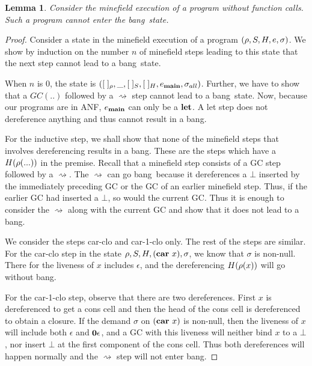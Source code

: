 \documentclass[preprint,9pt]{sigplanconf}
\newcommand{\warning}[1]{{\color{Myred}{#1}}}
\newcommand{\bang}{\mbox{\sc bang}}
\newtheorem{lemma}[theorem]{Lemma}
\begin{document}
\begin{lemma}
\label{lemma:call-less-cannot-go-bang-app}
Consider the minefield execution of  a program without function calls.
Such a program cannot enter the \bang\ state.
\end{lemma}
\begin{proof}
Consider a state in the minefield execution of a program $(\rho, S, H,
e, \sigma)$.   We show  by induction  on the  number $n$  of minefield
steps  leading to  this state  that  the next  step cannot  lead to  a
\bang\ state.

When $n$ is 0, the  state is $([\;]_\rho,\_, [\;]_{S} ,
[\;]_{H},  e_{\mathbf{main}},  \sigma_{all})$.  Further,  we
have   to  show   that   a  $GC(..)$   followed  by   a
$\rightsquigarrow$ step cannot lead  to a \bang\ state.
Now, because  our programs  are in  ANF, $e_{\mathbf{main}}$
can  only  be a  $\mbox{$\mathbf{ let}$}$.  A  {\sc  let} step  does  not
dereference anything and thus cannot result in a \bang.

For the inductive step, we  shall show that none of the
minefield steps that  involves dereferencing results in
a   \bang.   These  are   the   steps   which  have   a
$H(\rho(...))$ in the premise.  Recall that a minefield
step   consists   of   a   GC  step   followed   by   a
$\rightsquigarrow$.   The   $\rightsquigarrow$  can  go
\bang\ because it dereferences a $\bot$ inserted by the
immediately  preceding  GC  or  the GC  of  an  earlier
minefield step.  \warning{However the  demand $\sigma'$
  on basis of which an earlier GC would have inserted a
  $\bot$,  would  have   included  the  current  demand
  $\sigma$.}  Thus,  if the  earlier GC had  inserted a
$\bot$, so would the current  GC.  Thus it is enough to
consider the $\rightsquigarrow$  along with the current
GC and show that it does not lead to a \bang.

We consider the steps {\sc car-clo} and {\sc car-1-clo}
only. The rest  of the steps are similar.  For the {\sc
  car-clo}  step in  the state  $\rho, S,  H, (\mbox{$\mathbf{car}$}~x),
\sigma$, we  know that $\sigma$ is  non-null. There for
the  liveness  of  $x$  includes  $\epsilon$,  and  the
dereferencing $H(\rho(x))$ will go without \bang.

For the  {\sc car-1-clo}  step, observe that  there are
two dereferences.  First $x$  is dereferenced to  get a
cons  cell  and then  the  head  of  the cons  cell  is
dereferenced  to  obtain  a  closure.   If  the  demand
$\sigma$ on  $(\mbox{$\mathbf{car}$}~x)$ is non-null, then  the liveness
of    $x$   will    include    both   $\epsilon$    and
$\mathbf{0}\epsilon$,  and  a  GC with  this  liveness  will
neither bind $x$ to a  $\bot$, nor insert $\bot$ at the
first   component  of   the   cons   cell.  Thus   both
dereferences    will    happen   normally    and    the
$\rightsquigarrow$ step will not enter \bang.
\end{proof} 
\end{document}
